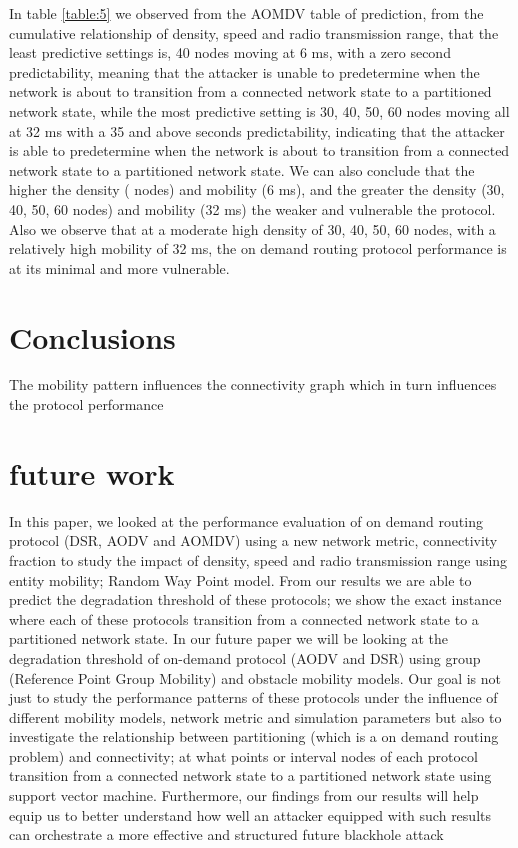 \documentclass[letterpaper, 10 pt, conference]{ieeeconf}  %
\begin{document}
In table \ref{table:5} we observed from the AOMDV table of prediction, from the cumulative relationship of density, speed and radio transmission range, that the least predictive settings is, 40 nodes moving at 6 ms, with a zero second predictability, meaning that the attacker is unable to predetermine when the network is about to transition from a connected network state to a partitioned network state, while the most predictive setting is 30, 40, 50, 60 nodes moving all at 32 ms with a 35 and above seconds predictability,  indicating that the attacker is able to predetermine when the network is about to transition from a connected network state to a partitioned network state. We can also conclude that the higher the density ( nodes) and mobility (6 ms), and the greater the density (30, 40, 50, 60 nodes) and mobility (32 ms) the weaker and vulnerable the protocol. Also we observe that at a moderate high density of 30, 40, 50, 60 nodes, with a relatively high mobility of 32 ms, the on demand routing protocol performance is at its minimal and more vulnerable.





\section{Conclusions}

The mobility pattern influences the connectivity graph which in turn influences the protocol performance

\section{future work} 

In this paper, we looked at the performance evaluation of on demand routing protocol (DSR, AODV and AOMDV) using a new network metric, connectivity fraction to study the impact of density, speed and radio transmission range using entity mobility; Random Way Point model. From our results we are able to predict the degradation threshold of these protocols; we show the exact instance where each of these protocols transition from a connected network state to a partitioned network state. In our future paper we will be looking at the degradation threshold of on-demand protocol (AODV and DSR) using group (Reference Point Group Mobility) and obstacle mobility models. Our goal is not just to study the performance patterns of these protocols under the influence of different mobility models, network metric and simulation parameters but also to investigate the relationship between partitioning (which is a on demand routing problem) and connectivity; at what points or interval nodes of each protocol transition from a connected network state to a partitioned network state using support vector machine. Furthermore, our findings from our results will help equip us to better understand how well an attacker equipped with such results can orchestrate a more effective and structured future blackhole attack
\end{document}
